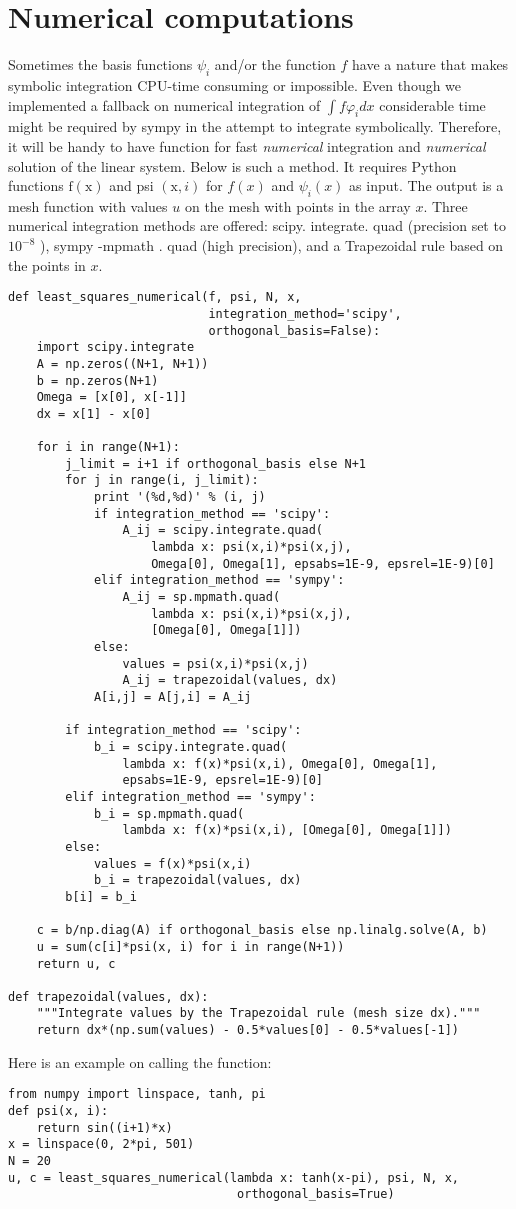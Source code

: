 \documentclass[../main.tex]{subfiles}
\begin{document}
\section[Numerical computations]{Numerical computations}
\label{sec:sec_2_9}
\noindent Sometimes the basis functions $\psi_{i}$ and/or the function $f$ have a nature that makes symbolic integration CPU-time consuming or impossible. Even though we implemented a fallback on numerical integration of $\int f \varphi_{i} d x$ considerable time might be required by sympy in the attempt to integrate symbolically. Therefore, it will be handy to have function for fast \textit{numerical} integration and \textit{numerical} solution of the linear system. Below is such a method. It requires Python functions $\mathrm{f}(\mathrm{x})$ and psi $(\mathrm{x}, i)$ for $f(x)$ and $\psi_{i}(x)$ as input. The output is a mesh function with values $u$ on the mesh with points in the array $x$. Three numerical integration methods are offered: scipy. integrate. quad (precision set to $10^{-8}$ ), sympy -mpmath . quad (high precision), and a Trapezoidal rule based on the points in $x$.
\begin{lstlisting}[numbers=none]
def least_squares_numerical(f, psi, N, x,
							integration_method='scipy',
							orthogonal_basis=False):
	import scipy.integrate
	A = np.zeros((N+1, N+1))
	b = np.zeros(N+1)
	Omega = [x[0], x[-1]]
	dx = x[1] - x[0]
	
	for i in range(N+1):
		j_limit = i+1 if orthogonal_basis else N+1
		for j in range(i, j_limit):
			print '(%d,%d)' % (i, j)
			if integration_method == 'scipy':
				A_ij = scipy.integrate.quad(
					lambda x: psi(x,i)*psi(x,j),
					Omega[0], Omega[1], epsabs=1E-9, epsrel=1E-9)[0]
			elif integration_method == 'sympy':
				A_ij = sp.mpmath.quad(
					lambda x: psi(x,i)*psi(x,j),
					[Omega[0], Omega[1]])
			else:
				values = psi(x,i)*psi(x,j)
				A_ij = trapezoidal(values, dx)
			A[i,j] = A[j,i] = A_ij
			
		if integration_method == 'scipy':
			b_i = scipy.integrate.quad(			
				lambda x: f(x)*psi(x,i), Omega[0], Omega[1],
				epsabs=1E-9, epsrel=1E-9)[0]
		elif integration_method == 'sympy':
			b_i = sp.mpmath.quad(
				lambda x: f(x)*psi(x,i), [Omega[0], Omega[1]])
		else:
			values = f(x)*psi(x,i)
			b_i = trapezoidal(values, dx)
		b[i] = b_i
		
	c = b/np.diag(A) if orthogonal_basis else np.linalg.solve(A, b)
	u = sum(c[i]*psi(x, i) for i in range(N+1))
	return u, c
	
def trapezoidal(values, dx):
	"""Integrate values by the Trapezoidal rule (mesh size dx)."""
	return dx*(np.sum(values) - 0.5*values[0] - 0.5*values[-1])
\end{lstlisting}
Here is an example on calling the function:
\begin{lstlisting}[numbers=none]
from numpy import linspace, tanh, pi
def psi(x, i):
	return sin((i+1)*x)
x = linspace(0, 2*pi, 501)
N = 20
u, c = least_squares_numerical(lambda x: tanh(x-pi), psi, N, x,
								orthogonal_basis=True)
\end{lstlisting}
\end{document}
